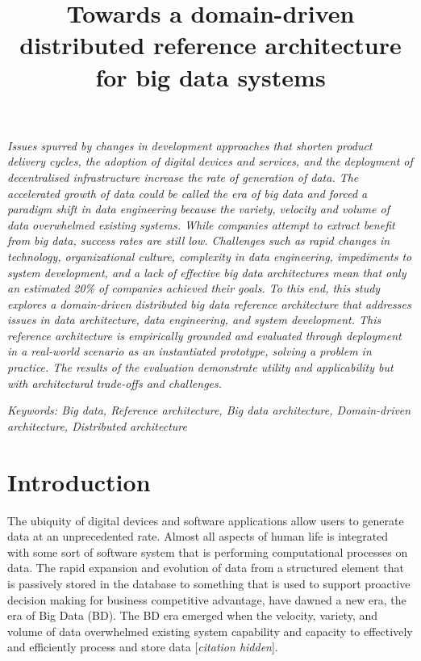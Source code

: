 \documentclass[a4paper,11pt]{article}
\title{Towards a domain-driven distributed reference architecture for big data systems}
\date{}
\let\cite\citep
\renewenvironment{abstract}
  {\quotation
  {\bfseries\noindent{\large\sffamily\abstractname}\par\nobreak\smallskip}    \noindent\itshape}
  {\endquotation}
\newcommand{\hc}{[\textit{citation hidden}]\textnormal{}}
\begin{document}
\maketitle{}
	 
\begin{abstract}
 Issues spurred by changes in development approaches that shorten product delivery cycles, the adoption of digital devices and services, and the deployment of decentralised infrastructure increase the rate of generation of data. The accelerated growth of data could be called the era of big data and forced a paradigm shift in data engineering because the variety, velocity and volume of data overwhelmed existing systems. While companies attempt to extract benefit from big data, success rates are still low. Challenges such as rapid changes in technology, organizational culture, complexity in data engineering, impediments to system development, and a lack of effective big data architectures mean that only an estimated 20\%{} of companies achieved their goals. To this end, this study explores a domain-driven distributed big data reference architecture that addresses issues in data architecture, data engineering, and system development. This reference architecture is empirically grounded and evaluated through deployment in a real-world scenario as an instantiated prototype, solving a problem in practice. The results of the evaluation demonstrate utility and applicability but with architectural trade-offs and challenges.
\end{abstract}


\noindent{}\emph{Keywords: Big data, Reference architecture, Big data architecture, Domain-driven architecture, Distributed architecture}


\section{Introduction}
\nobreak{}
The ubiquity of digital devices and software applications allow users to generate data at an unprecedented rate. Almost all aspects of human life is integrated with some sort of software system that is performing computational processes on data. The rapid expansion and evolution of data from a structured element that is passively stored in the database to something that is used to support proactive decision making for business
competitive advantage, have dawned a new era, the era of Big Data (BD). The BD era emerged when the velocity, variety, and volume of data overwhelmed existing system capability and capacity to effectively and efficiently process and store data 
\hc{}. 
\end{document}
